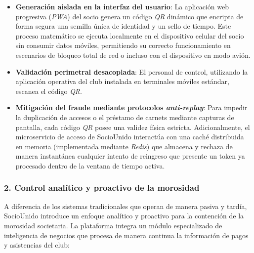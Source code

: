 \documentclass[conference, a4paper]{IEEEtran}
\begin{document}
\begin{itemize}
    \item \textbf{Generaci\'on aislada en la interfaz del usuario}: La aplicaci\'on web progresiva (\textit{PWA}) del socio genera un c\'odigo \textit{QR} din\'amico que encripta de forma segura una semilla \'unica de identidad y un sello de tiempo. Este proceso matem\'atico se ejecuta localmente en el dispositivo celular del socio sin consumir datos m\'oviles, permitiendo su correcto funcionamiento en escenarios de bloqueo total de red o incluso con el dispositivo en modo avi\'on.
    \item \textbf{Validaci\'on perimetral desacoplada}: El personal de control, utilizando la aplicaci\'on operativa del club instalada en terminales m\'oviles est\'andar, escanea el c\'odigo \textit{QR}. 
    \item \textbf{Mitigaci\'on del fraude mediante protocolos \textit{anti-replay}}: Para impedir la duplicaci\'on de accesos o el pr\'estamo de carnets mediante capturas de pantalla, cada c\'odigo \textit{QR} posee una validez f\'isica estricta. Adicionalmente, el microservicio de acceso de SocioUnido interact\'ua con una cach\'e distribuida en memoria (implementada mediante \textit{Redis}) que almacena y rechaza de manera instant\'anea cualquier intento de reingreso que presente un token ya procesado dentro de la ventana de tiempo activa.
\end{itemize}

\subsubsection{2. Control anal\'itico y proactivo de la morosidad}
A diferencia de los sistemas tradicionales que operan de manera pasiva y tard\'ia, SocioUnido introduce un enfoque anal\'itico y proactivo para la contenci\'on de la morosidad societaria. La plataforma integra un m\'odulo especializado de inteligencia de negocios que procesa de manera continua la informaci\'on de pagos y asistencias del club:
\end{document}
